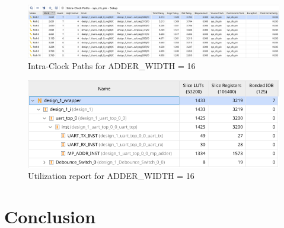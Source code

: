 \documentclass[a4paper,kul]{kulakarticle} %
\begin{document}
\begin{figure}[h]
	\centering
	\includegraphics[width=0.75\linewidth]{images/paths-16-bit.png}
	\caption{Intra-Clock Paths for ADDER\_WIDTH = 16}
	\label{fig:paths-16-bit}
\end{figure}

\begin{figure}[h]
	\centering
	\includegraphics[width=0.75\linewidth]{images/utilization-16-bit.png}
	\caption{Utilization report for ADDER\_WIDTH = 16}
	\label{fig:utilization-16-bit}
\end{figure}

\section{Conclusion}
\end{document}
